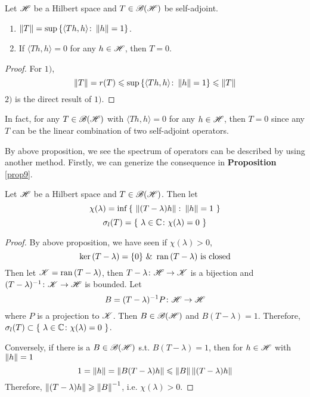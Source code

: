 \documentclass[a4paper,11pt]{report}
\begin{document}
\begin{cor} \label{cor8}
	Let $\mathscr{H}$ be a Hilbert space and $T \in \mathscr{B(H)}$ be self-adjoint.
	\begin{enumerate}[label=\arabic*)]
		\item $\left\lVert T\right\lVert = \sup{\{\langle Th,h \rangle \colon \left\lVert h\right\lVert = 1\}}$.
		\item If $\langle Th,h \rangle = 0$ for any $h \in \mathscr{H}$, then $T=0$.
	\end{enumerate}
\end{cor}
\begin{proof}
	For $1)$, 
	\begin{equation*}
		\left\lVert T\right\lVert = r(T) \leqslant \sup{\{\langle Th,h \rangle \colon \left\lVert h\right\lVert = 1\}} \leqslant \left\lVert T\right\lVert
	\end{equation*}
	$2)$ is the direct result of $1)$.
\end{proof}
\begin{rem}
	In fact, for any $T \in \mathscr{B(H)}$ with $\langle Th,h \rangle = 0$ for any $h \in \mathscr{H}$, then $T = 0$ since any $T$ can be the linear combination of two self-adjoint operators.
\end{rem}

By above proposition, we see the spectrum of operators can be described by using another method. Firstly, we can generize the consequence in \textbf{Proposition} \ref{prop9}.
\begin{prop} \label{prop15}
	Let $\mathscr{H}$ be a Hilbert space and $T \in \mathscr{B(H)}$. Then let 
	\begin{equation*}
		\chi(\lambda) = \inf{\{~\left\lVert(T-\lambda)h\right\lVert \colon \left\lVert h\right\lVert = 1~\}}
	\end{equation*}
	\begin{equation*}
		\sigma_l(T) =\{~\lambda \in \mathbb{C} \colon \chi(\lambda) = 0~\}
	\end{equation*}
\end{prop}
\begin{proof}
	By above proposition, we have seen if $\chi(\lambda) > 0$, 
	\begin{equation*}
		\ker{(T - \lambda)}=\{0\} ~\&~ \operatorname{ran}{(T - \lambda)} \text{ is closed}
	\end{equation*}
	Then let $\mathscr{K} = \operatorname{ran}{(T - \lambda)}$, then $T - \lambda \colon \mathscr{H} \rightarrow \mathscr{K}$ is a bijection and\\ $(T-\lambda)^{-1} \colon \mathscr{K} \rightarrow \mathscr{H}$ is bounded. Let
	\begin{equation*}
		B = (T-\lambda)^{-1}P \colon \mathscr{H} \rightarrow \mathscr{H}
	\end{equation*}
	where $P$ is a projection to $\mathscr{K}$. Then $B \in \mathscr{B(H)}$ and $B(T - \lambda) = 1$. Therefore, $\sigma_l(T) \subset \{~\lambda \in \mathbb{C} \colon \chi(\lambda) = 0~\}$.
	\item Conversely, if there is a $B \in \mathscr{B(H)}$ s.t. $B(T-\lambda)=1$, then
	for $h \in \mathscr{H}$ with $\left\lVert h\right\lVert = 1$
	\begin{equation*}
		1 = \left\lVert h\right\lVert = \left\lVert B(T-\lambda)h\right\lVert \leqslant \left\lVert B\right\lVert\left\lVert(T-\lambda)h\right\lVert
	\end{equation*}
	Therefore, $\left\lVert(T-\lambda)h\right\lVert \geqslant \left\lVert B\right\lVert^{-1}$, i.e. $\chi(\lambda) > 0$.
\end{proof}
\end{document}
